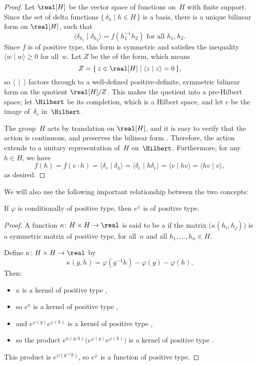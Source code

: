 \begin{proof}
Let $\real[H]$ be the vector space of functions on~$H$ with finite support. Since the set of delta functions $\{\,\delta_h \mid h \in H \,\}$ is a basis, there is a unique bilinear form on $\real[H]$, such that 
	$$ \text{$\langle \delta_{h_1} \mid  \delta_{h_2} \rangle = f(h_1^{-1} h_2)$ \ for all $h_1,h_2$} .$$
Since $f$ is of positive type, this form is symmetric and satisfies the inequality $\langle w \mid w \rangle \ge 0$ for all~$w$. Let $Z$ be the  of the form, which means
	$$ Z = \{\, z \in \real[H] \mid \langle z \mid z \rangle = 0 \,\} ,$$
so $\langle \, \mid \, \rangle$ factors through to a well-defined positive-definite, symmetric bilinear form on the quotient $\real[H]/Z$. This makes the quotient into a pre-Hilbert space; let $\Hilbert$ be its completion, which is a Hilbert space, and let $v$ be the image of~$\delta_e$ in~$\Hilbert$. 

The group~$H$ acts by translation on $\real[H]$, and it is easy to verify that the action is continuous, and preserves the bilinear form . Therefore, the action extends to a unitary representation of~$H$ on~$\Hilbert$. Furthermore, for any $h \in H$, we have
	$$ 
	f(h)
	= f(e \cdot h)
	= \langle  \delta_e \mid \delta_h \rangle
	= \langle  \delta_e \mid h\delta_e \rangle
	=  \langle v \mid hv \rangle
	= \langle hv \mid v \rangle
	, $$
as desired.
\end{proof}

We will also use the following important relationship between the two concepts:

\begin{lem} \label{Schoenberg}
If $\varphi$ is conditionally of positive type, then $e^\varphi$ is of positive type.
\end{lem}

\begin{proof}
A function $\kappa \colon H \times H \to \real$ is said to be a  if the matrix $\bigl( \kappa(h_i,h_j) \bigr)$ is a symmetric matrix of positive type, for all~$n$ and all $h_1,\ldots,h_n \in H$.

Define $\kappa \colon H \times H \to \real$ by
	$$ \kappa(g,h) = \varphi(g^{-1} h) - \varphi(g) - \varphi(h) .$$
Then:
	\begin{itemize}
	\item $\kappa$ is a kernel of positive type ,
	\item so $e^\kappa$ is a kernel of positive type ,
	\item and $e^{\varphi(g)} e^{\varphi(h)}$ is a kernel of positive type ,
	\item so the product $e^{\kappa(g,h)} \bigl( e^{\varphi(g)} e^{\varphi(h)} \bigr)$ is a kernel of positive type .
	\end{itemize}
This product is $e^{\varphi(g^{-1} h)}$, so $e^\varphi$ is a function of positive type.
\end{proof}

